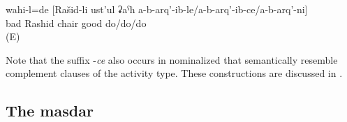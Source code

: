 \begin{exe}
	\ex	\label{ex:It was bad that Rashid did not repair the chair}
	\gll	wahi-l=de [Rašid-li ust'ul ʡaˁħ a-b-arq'-ib-le\slash a-b-arq'-ib-ce\slash a-b-arq'-ni]\\
		bad Rashid chair good do\slash{}do\slash{}do\\
	\glt	{} (E)
\end{exe}

Note that the suffix -\textit{ce} also occurs in nominalized  that semantically resemble complement clauses of the activity type. These constructions are discussed in .


\subsection{The masdar}
\label{ssec:The masdarComplementation}

